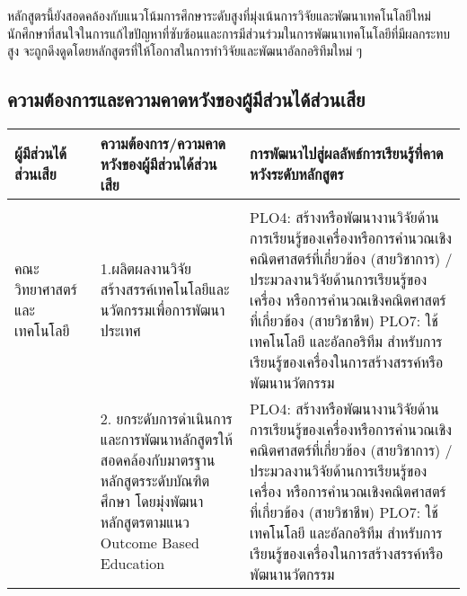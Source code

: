 หลักสูตรนี้ยังสอดคล้องกับแนวโน้มการศึกษาระดับสูงที่มุ่งเน้นการวิจัยและพัฒนาเทคโนโลยีใหม่ นักศึกษาที่สนใจในการแก้ไขปัญหาที่ซับซ้อนและการมีส่วนร่วมในการพัฒนาเทคโนโลยีที่มีผลกระทบสูง จะถูกดึงดูดโดยหลักสูตรที่ให้โอกาสในการทำวิจัยและพัฒนาอัลกอริทึมใหม่ ๆ


\clearpage
\subsection{ความต้องการและความคาดหวังของผู้มีส่วนได้ส่วนเสีย}

\begin{longtable}{|p{} | p{}| p{} |}
\hline
\textbf{ผู้มีส่วนได้ส่วนเสีย} & \textbf{ความต้องการ/ความคาดหวังของผู้มีส่วนได้ส่วนเสีย} & \textbf{การพัฒนาไปสู่ผลลัพธ์การเรียนรู้ที่คาดหวังระดับหลักสูตร}\\ \hline
\endhead

\hline
\endfoot

\multicolumn{3}{|l|}{\textbf{1. ผู้มีส่วนได้เสียภายในหน่วยงาน}} \\ \hline

คณะวิทยาศาสตร์และเทคโนโลยี & 

1.ผลิตผลงานวิจัย สร้างสรรค์เทคโนโลยีและนวัตกรรมเพื่อการพัฒนาประเทศ
& PLO4: สร้างหรือพัฒนางานวิจัยด้านการเรียนรู้ของเครื่องหรือการคำนวณเชิงคณิตศาสตร์ที่เกี่ยวข้อง (สายวิชาการ) / ประมวลงานวิจัยด้านการเรียนรู้ของเครื่อง หรือการคำนวณเชิงคณิตศาสตร์ที่เกี่ยวข้อง (สายวิชาชีพ)\newline 
PLO7: ใช้เทคโนโลยี และอัลกอริทึม สำหรับการเรียนรู้ของเครื่องในการสร้างสรรค์หรือพัฒนานวัตกรรม \\ \cline{2-3}
&2. ยกระดับการดำเนินการและการพัฒนาหลักสูตรให้สอดคล้องกับมาตรฐานหลักสูตรระดับบัณฑิตศึกษา โดยมุ่งพัฒนาหลักสูตรตามแนว Outcome Based Education
& PLO4: สร้างหรือพัฒนางานวิจัยด้านการเรียนรู้ของเครื่องหรือการคำนวณเชิงคณิตศาสตร์ที่เกี่ยวข้อง (สายวิชาการ) / ประมวลงานวิจัยด้านการเรียนรู้ของเครื่อง หรือการคำนวณเชิงคณิตศาสตร์ที่เกี่ยวข้อง (สายวิชาชีพ)\newline 
PLO7: ใช้เทคโนโลยี และอัลกอริทึม สำหรับการเรียนรู้ของเครื่องในการสร้างสรรค์หรือพัฒนานวัตกรรม \\ \hline


\end{longtable}

